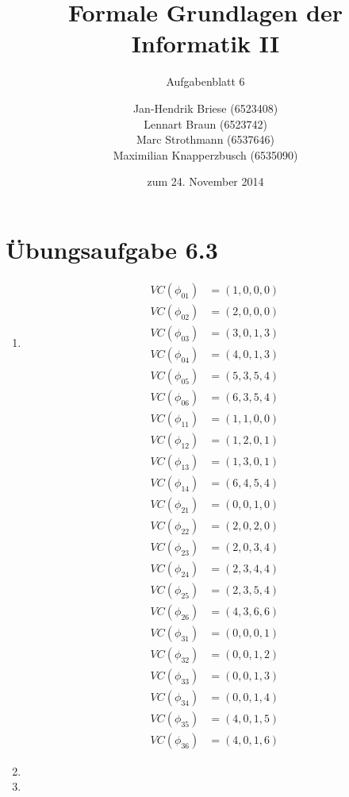 \documentclass[a4paper]{scrartcl}
\title{Formale Grundlagen der Informatik II}
\subtitle{Aufgabenblatt 6}
\author{
    Jan-Hendrik Briese (6523408) \\
    Lennart Braun (6523742) \\
    Marc Strothmann (6537646) \\
    Maximilian Knapperzbusch (6535090)
}
\date{zum 24. November 2014}
\begin{document}
\maketitle

\section*{Übungsaufgabe 6.3} 
\begin{enumerate}
    \item
        \begin{align*}
            VC(\phi_{01}) &= (1, 0, 0, 0) \\
            VC(\phi_{02}) &= (2, 0, 0, 0) \\
            VC(\phi_{03}) &= (3, 0, 1, 3) \\
            VC(\phi_{04}) &= (4, 0, 1, 3) \\
            VC(\phi_{05}) &= (5, 3, 5, 4) \\
            VC(\phi_{06}) &= (6, 3, 5, 4)
        \end{align*}
        \begin{align*}
            VC(\phi_{11}) &= (1, 1, 0, 0) \\
            VC(\phi_{12}) &= (1, 2, 0, 1) \\
            VC(\phi_{13}) &= (1, 3, 0, 1) \\
            VC(\phi_{14}) &= (6, 4, 5, 4)
        \end{align*}
        \begin{align*}
            VC(\phi_{21}) &= (0, 0, 1, 0) \\
            VC(\phi_{22}) &= (2, 0, 2, 0) \\
            VC(\phi_{23}) &= (2, 0, 3, 4) \\
            VC(\phi_{24}) &= (2, 3, 4, 4) \\
            VC(\phi_{25}) &= (2, 3, 5, 4) \\
            VC(\phi_{26}) &= (4, 3, 6, 6)
        \end{align*}
        \begin{align*}
            VC(\phi_{31}) &= (0, 0, 0, 1) \\
            VC(\phi_{32}) &= (0, 0, 1, 2) \\
            VC(\phi_{33}) &= (0, 0, 1, 3) \\
            VC(\phi_{34}) &= (0, 0, 1, 4) \\
            VC(\phi_{35}) &= (4, 0, 1, 5) \\
            VC(\phi_{36}) &= (4, 0, 1, 6)
        \end{align*}

    \item

    \item

\end{enumerate}
\end{document}
